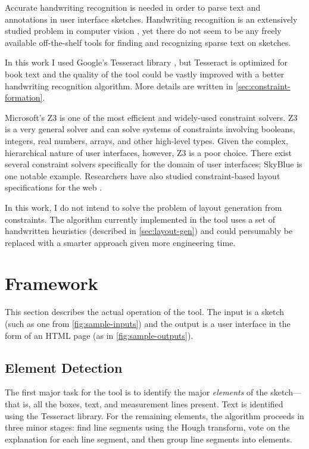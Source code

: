 \documentclass{article}
\begin{document}
Accurate handwriting recognition is needed in order to parse text and
annotations in user interface sketches. Handwriting recognition is an
extensively studied problem in computer vision \cite{HandwritingRecSurvey2000},
yet there do not seem to be any freely available off-the-shelf tools for finding
and recognizing sparse text on sketches.

In this work I used Google's Tesseract library \cite{Tesseract}, but Tesseract
is optimized for book text and the quality of the tool could be vastly improved
with a better handwriting recognition algorithm. More details are written in
\autoref{sec:constraint-formation}.

Microsoft's Z3 \cite{Z32008} is one of the most efficient and widely-used
constraint solvers. Z3 is a very general solver and can solve systems of
constraints involving booleans, integers, real numbers, arrays, and other
high-level types. Given the complex, hierarchical nature of user interfaces,
however, Z3 is a poor choice. There exist several constraint solvers
specifically for the domain of user interfaces; SkyBlue \cite{SkyBlue1994} is
one notable example. Researchers have also studied constraint-based layout
specifications for the web \cite{ConstraintsForTheWeb1997}.

In this work, I do not intend to solve the problem of layout generation from
constraints. The algorithm currently implemented in the tool uses a set of
handwritten heuristics (described in \autoref{sec:layout-gen}) and could
persumably be replaced with a smarter approach given more engineering time.

\section{Framework}

This section describes the actual operation of the tool. The input is a sketch
(such as one from \autoref{fig:sample-inputs}) and the output is a user
interface in the form of an HTML page (as in \autoref{fig:sample-outputs}).

\subsection{Element Detection}
\label{sec:element-detection}

The first major task for the tool is to identify the major \emph{elements} of
the sketch---that is, all the boxes, text, and measurement lines present. Text
is identified using the Tesseract library. For the remaining elements, the
algorithm proceeds in three minor stages: find line segments using the Hough
transform, vote on the explanation for each line segment, and then group line
segments into elements.
\end{document}
